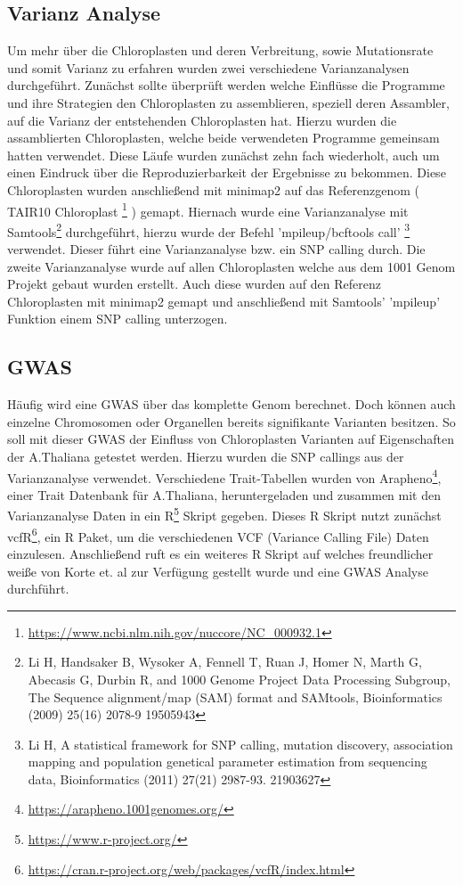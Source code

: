 \documentclass{scrartcl}
\begin{document}
\subsection{Varianz Analyse}
\label{sec-3-3}
Um mehr über die Chloroplasten und deren Verbreitung, sowie Mutationsrate und somit Varianz zu erfahren wurden zwei verschiedene Varianzanalysen durchgeführt. 
Zunächst sollte überprüft werden welche Einflüsse die Programme und ihre Strategien den Chloroplasten zu assemblieren, speziell deren Assambler, auf die Varianz der 
entstehenden Chloroplasten hat. Hierzu wurden die assamblierten Chloroplasten, welche beide verwendeten Programme gemeinsam hatten verwendet. Diese Läufe wurden zunächst
zehn fach wiederholt, auch um einen Eindruck über die Reproduzierbarkeit der Ergebnisse zu bekommen. Diese Chloroplasten wurden anschließend mit minimap2 \footnotemark[46]{} auf das 
Referenzgenom ( TAIR10 Chloroplast \footnote{\url{https://www.ncbi.nlm.nih.gov/nuccore/NC_000932.1}} ) gemapt. Hiernach wurde eine Varianzanalyse mit Samtools\footnote{Li H, Handsaker B, Wysoker A, Fennell T, Ruan J, Homer N, Marth G, Abecasis G, Durbin R, and 1000 Genome Project Data Processing Subgroup, The Sequence alignment/map (SAM) format and SAMtools, Bioinformatics (2009) 25(16) 2078-9 19505943} durchgeführt, hierzu wurde der Befehl
'mpileup/bcftools call' \footnote{Li H, A statistical framework for SNP calling, mutation discovery, association mapping and population genetical parameter estimation from sequencing data, Bioinformatics (2011) 27(21) 2987-93. 21903627} verwendet. Dieser führt eine Varianzanalyse bzw. ein SNP calling durch. Die zweite Varianzanalyse wurde auf allen Chloroplasten welche aus dem
1001 Genom Projekt gebaut wurden erstellt. Auch diese wurden auf den Referenz Chloroplasten mit minimap2 gemapt und anschließend mit Samtools' 'mpileup' Funktion einem
SNP calling unterzogen. 

\subsection{GWAS}
\label{sec-3-4}
Häufig wird eine GWAS über das komplette Genom berechnet. Doch können auch einzelne Chromosomen oder Organellen bereits signifikante Varianten besitzen. 
So soll mit dieser GWAS der Einfluss von Chloroplasten Varianten auf Eigenschaften der A.Thaliana getestet werden. Hierzu wurden die SNP callings aus der Varianzanalyse verwendet.
Verschiedene Trait-Tabellen wurden von Arapheno\footnote{\url{https://arapheno.1001genomes.org/}}, einer Trait Datenbank für A.Thaliana, heruntergeladen und zusammen mit den Varianzanalyse Daten in ein R\footnote{\url{https://www.r-project.org/}} Skript gegeben.
Dieses R Skript nutzt zunächst vcfR\footnote{\url{https://cran.r-project.org/web/packages/vcfR/index.html}}, ein R Paket, um die verschiedenen VCF (Variance Calling File) Daten einzulesen. Anschließend ruft es ein weiteres R Skript auf welches
freundlicher weiße von Korte et. al\footnotemark[39]{} zur Verfügung gestellt wurde und eine GWAS Analyse durchführt.
\end{document}
